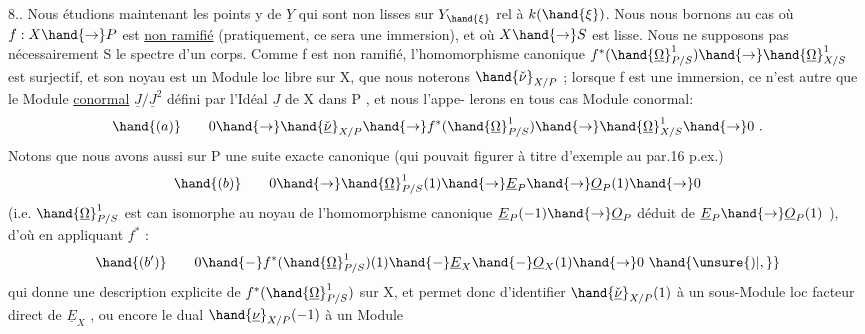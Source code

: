 
8.. Nous étudions maintenant les points  y de $\underline{Y}$ qui sont non lisses
sur $Y_{\hand{\xi}}$ rel à $k(\hand{\xi})$. Nous nous  bornons au cas où  $f:X\hand{\to} P$  est \uline{non ramifié}
(pratiquement, ce sera une immersion), et où $X\hand{\to} S$ est lisse.  Nous ne
supposons pas nécessairement S le spectre d'un corps.  
 Comme
f  est non ramifié, l'homomorphisme canonique   $f^*(\hand{\underline{\Omega}}^1_{P/S})\hand{\to}\hand{\underline{\Omega}}^1_{X/S}$
est surjectif, et son noyau est un Module loc libre sur X, que nous
noterons  $\hand{\check{\nu}}_{X/P}$ ; lorsque f est une immersion, ce n'est autre que le
Module \uline{conormal}  $\underline{J}/\underline{J}^2$  défini par l'Idéal $\underline{J}$ de X dans P , et nous l'appe-%
lerons en tous cas Module conormal:
\[ \hand{(a)} \qquad 0\hand{\to}\hand{\check{\underline{\nu}}}_{X/P}\hand{\to} f^*(\hand{\underline{\Omega}}^1_{P/S})\hand{\to}\hand{\underline{\Omega}}^1_{X/S}\hand{\to} 0 \ . \]
\margin{\hand{$|||$}}
Notons que nous avons aussi sur  P  une suite exacte canonique
(qui pouvait figurer à titre d'exemple au par.16 p.ex.)
\[ \hand{(b)} \qquad 0\hand{\to}\hand{\underline{\Omega}}^1_{P/S}(1)\hand{\to}\underline{E}_P\hand{\to}\underline{O}_P(1)\hand{\to} 0 \]
(i.e. $\hand{\underline{\Omega}}^1_{P/S}$ est can isomorphe au noyau de l'homomorphisme canonique
$\underline{E}_P(-1)\hand{\to}\underline{O}_P$  déduit de $\underline{E}_P\hand{\to}\underline{O}_P(1)$ ), d'où en appliquant $f^*$ :
\[ \hand{(b')} \qquad 0 \hand{-} f^*(\hand{\underline{\Omega}}^1_{P/S})(1) \hand{-} \underline{E}_X \hand{-} \underline{O}_X(1)\hand{\to} 0 \ \hand{\unsure{)|,}} \]
qui donne une description explicite de  $f^*(\hand{\underline{\Omega}}^1_{P/S})$   sur X, et
permet  donc d'identifier $\hand{\check{\underline{\nu}}}_{X/P}(1)$  à un sous-Module loc facteur direct
de $\underline{E}_X$ , ou encore le  dual  $\hand{\underline{\nu}}_{X/P}(-1)$  à un Module
